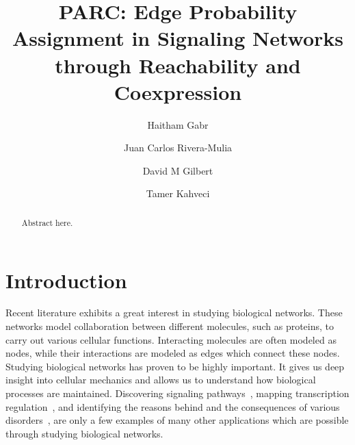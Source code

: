 \documentclass[runningheads,a4paper]{llncs}
\begin{document}
\mainmatter 

\title{PARC: Edge Probability Assignment in Signaling Networks through
Reachability and Coexpression}


\author{Haitham Gabr \and Juan Carlos Rivera-Mulia \and David M
Gilbert \and Tamer Kahveci}




\maketitle


\begin{abstract}
Abstract here.
\end{abstract}

\section{Introduction}

Recent literature exhibits a great interest in studying biological networks.
These networks model collaboration between different molecules, such as
proteins, to carry out various cellular functions. Interacting molecules are
often modeled as nodes, while their interactions are modeled as edges which
connect these nodes.
Studying biological networks has proven to be highly important. It gives us deep
insight into cellular mechanics and allows us to understand how biological
processes are maintained. Discovering signaling
pathways~\cite{missing}, mapping transcription regulation~\cite{missing}, and
identifying the reasons behind and the consequences of various
disorders~\cite{missing}, are only a few examples of many other applications
which are possible through studying biological networks.
\end{document}
